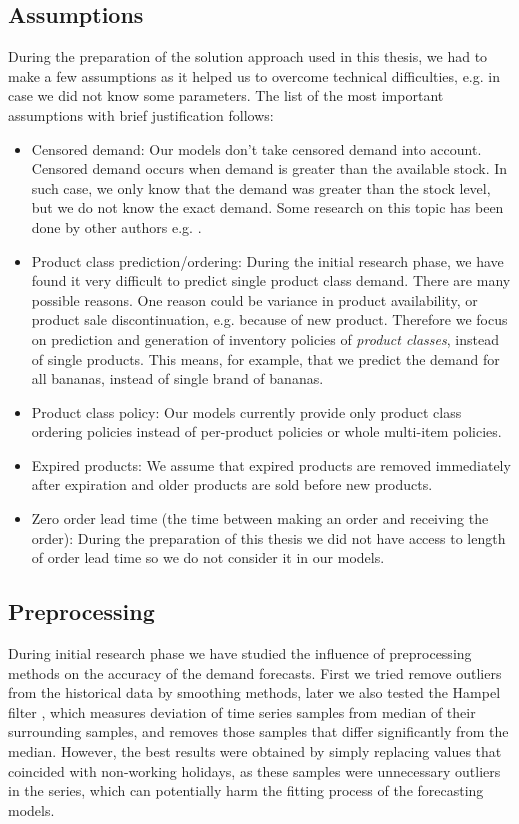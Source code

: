 \documentclass[11pt,a4paper]{article}
\begin{document}
\subsection{Assumptions}
During the preparation of the solution approach used in this thesis, we had to make a few assumptions as it helped us to overcome technical difficulties, e.g. in case we did not know some parameters.
The list of the most important assumptions with brief justification follows:
\begin{itemize}
\item Censored demand: Our models don't take censored demand into account. Censored demand occurs when demand is greater than the available stock. In such case, we only know that the demand was greater than the stock level, but we do not know the exact demand. Some research on this topic has been done by other authors  e.g. \cite{sachs2015data}.
\item Product class prediction/ordering: During the initial research phase, we have found it very difficult to predict single product class demand. There are many possible reasons. One reason could be variance in product availability, or product sale discontinuation, e.g. because of new product. Therefore we focus on prediction and generation of inventory policies of \textit{product classes}, instead of single products. This means, for example, that we predict the demand for all bananas, instead of single brand of bananas.
\item Product class policy: Our models currently provide only product class ordering policies instead of per-product policies or whole multi-item policies.
\item Expired products: We assume that expired products are removed immediately after expiration and older products are sold before new products.
\item Zero order lead time (the time between making an order and receiving the order): During the preparation of this thesis we did not have access to length of order lead time so we do not consider it in our models.

\end{itemize}

\subsection{Preprocessing}
During initial research phase we have studied the influence of preprocessing methods on the accuracy of the demand forecasts. First we tried remove outliers from the historical data by smoothing methods, later we also tested the Hampel filter \cite{hampel}, which measures deviation of time series samples from median of their surrounding samples, and removes those samples that differ significantly from the median. However, the best results were obtained by simply replacing values that coincided with non-working holidays, as these samples were unnecessary outliers in the series, which can potentially harm the fitting process of the forecasting models.
\end{document}
